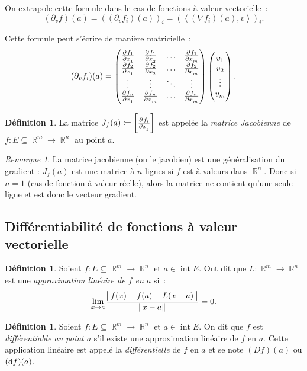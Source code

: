 \documentclass{article}
\DeclareMathOperator{\intr}{int}
\DeclareMathOperator{\R}{\mathbb R}
\newcommand{\scpr}[2]{{\left\langle#1, #2\right\rangle}}
\newcommand{\frmrn}[2]{#1 : #2 \subseteq \R^m \to \R^n}
\theoremstyle{definition}
\newtheorem{déf}[thm]{Définition}
\theoremstyle{remark}
\newtheorem*{rmq}{Remarque}
\begin{document}
		On extrapole cette formule dans le cas de fonctions à valeur vectorielle~:
		\[(\partial_vf)(a) = \left((\partial_vf_i)(a)\right)_i = \left(\scpr{(\nabla f_i)(a)}v\right)_i.\]

		Cette formule peut s'écrire de manière matricielle~:
		\[(\partial_vf_i)(a) =
		\begin{pmatrix}
			\pd {f_1}{x_1} & \pd {f_1}{x_2} & \ldots & \pd {f_1}{x_m} \\
			\pd {f_2}{x_1} & \pd {f_2}{x_2} & \ldots & \pd {f_2}{x_m} \\
			     \vdots    &      \vdots    & \ddots &     \vdots     \\
			\pd {f_n}{x_1} & \pd {f_n}{x_m} & \ldots & \pd {f_n}{x_m}
		\end{pmatrix}
		\begin{pmatrix}
			v_1 \\ v_2 \\ \vdots \\ v_m
		\end{pmatrix}.\]

		\begin{déf} La matrice $J_f(a) \coloneqq \left[\pd {f_i}{x_j}\right]$ est appelée la \emph{matrice Jacobienne} de $\frmrn fE$ au point $a$. \end{déf}

		\begin{rmq} La matrice jacobienne (ou le jacobien) est une généralisation du gradient : $J_f(a)$ est une matrice à $n$ lignes si $f$ est à valeurs dans
		$\R^n$. Donc si $n = 1$ (cas de fonction à valeur réelle), alors la matrice ne contient qu'une seule ligne et est donc le vecteur gradient.
		\end{rmq}

	\subsection{Différentiabilité de fonctions à valeur vectorielle}
		\begin{déf} Soient $\frmrn fE$ et $a \in \intr E$. Ont dit que $L : \R^m \to \R^n$ est une \emph{approximation linéaire de $f$ en $a$} si~:
		\[\lim_{x \to a}\frac {\norm {f(x)-f(a)-L(x-a)}}{\norm {x-a}} = 0.\]
		\end{déf}

		\begin{déf} Soient $\frmrn fE$ et $a \in \intr E$. On dit que $f$ est \emph{différentiable au point $a$} s'il existe une approximation linéaire de $f$
		en $a$. Cette application linéaire est appelé la \emph{différentielle} de $f$ en $a$ et se note $(Df)(a)$ ou $(\dif f)(a)$.
		\end{déf}
\end{document}

